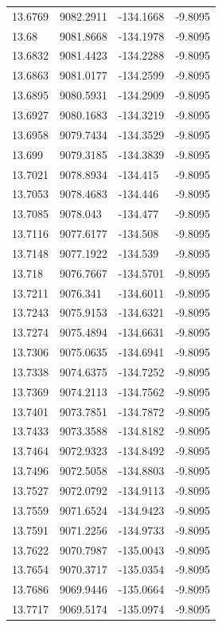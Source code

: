 \begin{table}[H]
\begin{tabular}{llll}
13.6769 & 9082.2911 & -134.1668 & -9.8095 \\
13.68 & 9081.8668 & -134.1978 & -9.8095 \\
13.6832 & 9081.4423 & -134.2288 & -9.8095 \\
13.6863 & 9081.0177 & -134.2599 & -9.8095 \\
13.6895 & 9080.5931 & -134.2909 & -9.8095 \\
13.6927 & 9080.1683 & -134.3219 & -9.8095 \\
13.6958 & 9079.7434 & -134.3529 & -9.8095 \\
13.699 & 9079.3185 & -134.3839 & -9.8095 \\
13.7021 & 9078.8934 & -134.415 & -9.8095 \\
13.7053 & 9078.4683 & -134.446 & -9.8095 \\
13.7085 & 9078.043 & -134.477 & -9.8095 \\
13.7116 & 9077.6177 & -134.508 & -9.8095 \\
13.7148 & 9077.1922 & -134.539 & -9.8095 \\
13.718 & 9076.7667 & -134.5701 & -9.8095 \\
13.7211 & 9076.341 & -134.6011 & -9.8095 \\
13.7243 & 9075.9153 & -134.6321 & -9.8095 \\
13.7274 & 9075.4894 & -134.6631 & -9.8095 \\
13.7306 & 9075.0635 & -134.6941 & -9.8095 \\
13.7338 & 9074.6375 & -134.7252 & -9.8095 \\
13.7369 & 9074.2113 & -134.7562 & -9.8095 \\
13.7401 & 9073.7851 & -134.7872 & -9.8095 \\
13.7433 & 9073.3588 & -134.8182 & -9.8095 \\
13.7464 & 9072.9323 & -134.8492 & -9.8095 \\
13.7496 & 9072.5058 & -134.8803 & -9.8095 \\
13.7527 & 9072.0792 & -134.9113 & -9.8095 \\
13.7559 & 9071.6524 & -134.9423 & -9.8095 \\
13.7591 & 9071.2256 & -134.9733 & -9.8095 \\
13.7622 & 9070.7987 & -135.0043 & -9.8095 \\
13.7654 & 9070.3717 & -135.0354 & -9.8095 \\
13.7686 & 9069.9446 & -135.0664 & -9.8095 \\
13.7717 & 9069.5174 & -135.0974 & -9.8095 \\

\end{tabular}
\end{table}
